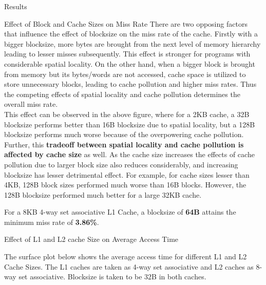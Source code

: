 \begin{section}{Results}
\begin{subsection}{Effect of Block and Cache Sizes on Miss Rate}
    There are two opposing factors that influence the effect of blocksize on the miss rate of the cache. Firstly with a bigger blocksize, more bytes are brought from the next level of memory hierarchy leading to lesser misses subsequently. This effect is stronger for programs with considerable spatial locality. On the other hand, when a bigger block is brought from memory but its bytes/words are not accessed, cache space is utilized to store unnecessary blocks, leading to cache pollution and higher miss rates. Thus the competing effects of spatial locality and cache pollution determines the overall miss rate.\\
    This effect can be observed in the above figure, where for a 2KB cache, a 32B blocksize performs better than 16B blocksize due to spatial locality, but a 128B blocksize performs much worse because of the overpowering cache pollution.\\
    Further, this \textbf{tradeoff between spatial locality and cache pollution is affected by cache size} as well. As the cache size increases the effects of cache pollution due to larger block size also reduces considerably, and increasing blocksize has lesser detrimental effect. For example, for cache sizes lesser than 4KB, 128B block sizes performed much worse than 16B blocks. However, the 128B blocksize performed much better for a large 32KB cache.   

    For a 8KB 4-way set associative L1 Cache, a blocksize of \textbf{64B} attains the minimum miss rate of \textbf{3.86\%}.
    
    \end{subsection}

    \begin{subsection}{Effect of L1 and L2 cache Size on Average Access Time}

    The surface plot below shows the average access time for different L1 and L2 Cache Sizes. The L1 caches are taken as 4-way set associative and L2 caches as 8-way set associative. Blocksize is taken to be 32B in both caches.


\end{subsection}
\end{section}
